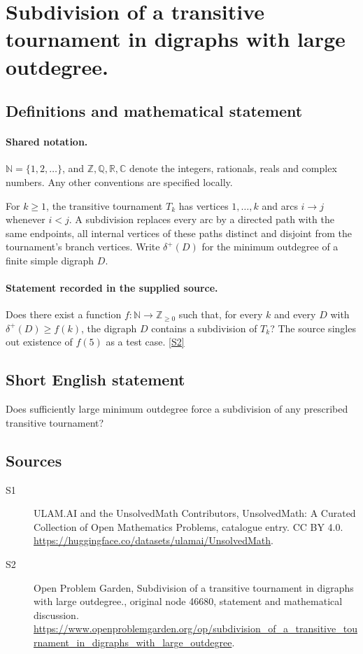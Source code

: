 \documentclass[11pt]{article}
\newcommand{\sref}[2]{\hyperlink{source:#1:#2}{[S#2]}}
\begin{document}
\section{Subdivision of a transitive tournament in digraphs with large outdegree.}\label{statement}

\subsection{Definitions and mathematical statement}

\paragraph{Shared notation.}$\mathbb N=\{1,2,\ldots\}$, and $\mathbb Z,\mathbb Q,\mathbb R,\mathbb C$ denote the integers, rationals, reals and complex numbers. Any other conventions are specified locally.


For $k\ge1$, the transitive tournament $T_k$ has vertices $1,\ldots,k$ and arcs $i\to j$ whenever $i<j$. A subdivision replaces every arc by a directed path with the same endpoints, all internal vertices of these paths distinct and disjoint from the tournament's branch vertices. Write $\delta^+(D)$ for the minimum outdegree of a finite simple digraph $D$.
\paragraph{Statement recorded in the supplied source.}
Does there exist a function $f:\mathbb N\to\mathbb Z_{\ge0}$ such that, for every $k$ and every $D$ with $\delta^+(D)\ge f(k)$, the digraph $D$ contains a subdivision of $T_k$? The source singles out existence of $f(5)$ as a test case. \sref{statement}{2}
\subsection{Short English statement}
Does sufficiently large minimum outdegree force a subdivision of any prescribed transitive tournament?
\subsection{Sources}
\begin{description}
\item[\hypertarget{source:statement:1}{S1}] ULAM.AI and the UnsolvedMath Contributors, UnsolvedMath: A Curated Collection of Open Mathematics Problems, catalogue entry. CC BY 4.0. \url{https://huggingface.co/datasets/ulamai/UnsolvedMath}.
\item[\hypertarget{source:statement:2}{S2}] Open Problem Garden, Subdivision of a transitive tournament in digraphs with large outdegree., original node 46680, statement and mathematical discussion. \url{https://www.openproblemgarden.org/op/subdivision_of_a_transitive_tournament_in_digraphs_with_large_outdegree}.
\end{description}
\label{end:statement}
\end{document}
